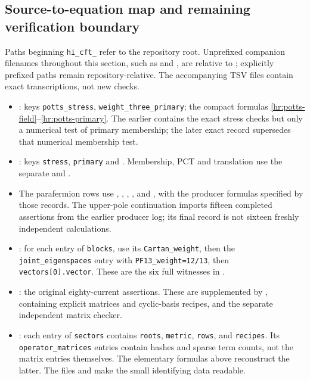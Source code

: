 \subsection{Source-to-equation map and remaining verification boundary}

Paths beginning \texttt{hi\_cft\_} refer to the repository root.
Unprefixed companion filenames throughout this section, such as
 and , are
relative to ; explicitly prefixed
paths remain repository-relative.  The accompanying TSV files
contain exact transcriptions, not new checks.
\begin{itemize}
\item {}:
keys \texttt{potts\_stress}, \texttt{weight\_three\_primary};
the compact formulas \eqref{hr:potts-field}--\eqref{hr:potts-primary}.
The earlier  contains the
exact stress checks but only a numerical test of primary membership;
the later exact record supersedes that numerical membership test.
\item {}:
keys \texttt{stress}, \texttt{primary} and
.
Membership, PCT and translation use the separate
 and
.
\item The parafermion rows use
,
,
,
, and
, with the producer
formulas specified by those records. The upper-pole continuation
imports fifteen completed assertions from the earlier producer log;
its final record is not sixteen freshly independent calculations.
\item {}:
for each entry of \texttt{blocks}, use its
\texttt{Cartan\_weight}, then the \texttt{joint\_eigenspaces}
entry with \texttt{PF13\_weight=12/13}, then
\texttt{vectors[0].vector}. These are the six full witnesses
in .
\item {}:
the original eighty-current assertions. These are supplemented by
, containing explicit matrices and
cyclic-basis recipes, and the separate independent matrix checker.
\item {}:
each entry of \texttt{sectors} contains \texttt{roots},
\texttt{metric}, \texttt{rows}, and \texttt{recipes}.
Its \texttt{operator\_matrices} entries contain hashes and sparse
term counts, not the matrix entries themselves. The elementary
formulas above reconstruct the latter. The files
 and
 make the small identifying data readable.
\end{itemize}

